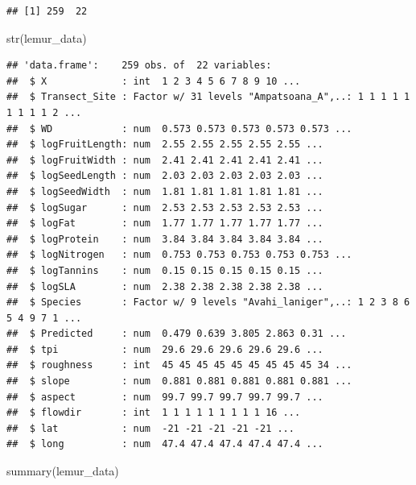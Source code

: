\documentclass[
  12pt,
]{article}
\newenvironment{Shaded}{\begin{snugshade}}{\end{snugshade}}
\newcommand{\FunctionTok}[1]{\textcolor[rgb]{0.00,0.00,0.00}{#1}}
\newcommand{\NormalTok}[1]{#1}
\begin{document}
\begin{verbatim}
## [1] 259  22
\end{verbatim}

\begin{Shaded}
\begin{Highlighting}[]
\FunctionTok{str}\NormalTok{(lemur\_data)}
\end{Highlighting}
\end{Shaded}

\begin{verbatim}
## 'data.frame':    259 obs. of  22 variables:
##  $ X             : int  1 2 3 4 5 6 7 8 9 10 ...
##  $ Transect_Site : Factor w/ 31 levels "Ampatsoana_A",..: 1 1 1 1 1 1 1 1 1 2 ...
##  $ WD            : num  0.573 0.573 0.573 0.573 0.573 ...
##  $ logFruitLength: num  2.55 2.55 2.55 2.55 2.55 ...
##  $ logFruitWidth : num  2.41 2.41 2.41 2.41 2.41 ...
##  $ logSeedLength : num  2.03 2.03 2.03 2.03 2.03 ...
##  $ logSeedWidth  : num  1.81 1.81 1.81 1.81 1.81 ...
##  $ logSugar      : num  2.53 2.53 2.53 2.53 2.53 ...
##  $ logFat        : num  1.77 1.77 1.77 1.77 1.77 ...
##  $ logProtein    : num  3.84 3.84 3.84 3.84 3.84 ...
##  $ logNitrogen   : num  0.753 0.753 0.753 0.753 0.753 ...
##  $ logTannins    : num  0.15 0.15 0.15 0.15 0.15 ...
##  $ logSLA        : num  2.38 2.38 2.38 2.38 2.38 ...
##  $ Species       : Factor w/ 9 levels "Avahi_laniger",..: 1 2 3 8 6 5 4 9 7 1 ...
##  $ Predicted     : num  0.479 0.639 3.805 2.863 0.31 ...
##  $ tpi           : num  29.6 29.6 29.6 29.6 29.6 ...
##  $ roughness     : int  45 45 45 45 45 45 45 45 45 34 ...
##  $ slope         : num  0.881 0.881 0.881 0.881 0.881 ...
##  $ aspect        : num  99.7 99.7 99.7 99.7 99.7 ...
##  $ flowdir       : int  1 1 1 1 1 1 1 1 1 16 ...
##  $ lat           : num  -21 -21 -21 -21 -21 ...
##  $ long          : num  47.4 47.4 47.4 47.4 47.4 ...
\end{verbatim}

\begin{Shaded}
\begin{Highlighting}[]
\FunctionTok{summary}\NormalTok{(lemur\_data)}
\end{Highlighting}
\end{Shaded}
\end{document}
